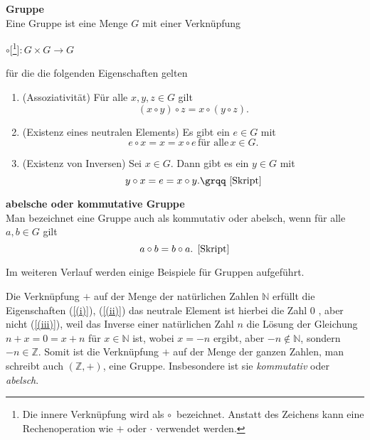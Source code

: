 \theoremstyle {definition}
\begin{definition} {\textbf{Gruppe}
\label{Gruppe}
	\\ {\glqq}Eine Gruppe ist eine Menge $G$ mit einer Verknüpfung 
\begin{center}
$\circ$[\footnote{Die innere Verknüpfung wird als \glqq $\circ$\grqq \, bezeichnet. Anstatt des Zeichens kann eine Rechenoperation wie $+$ oder $\cdot$ verwendet werden.}]$ : G \times G \rightarrow G$ 
\end{center}
für die die folgenden Eigenschaften gelten
\begin{enumerate}
	\item (Assoziativität) Für alle $x, y, z \in G$ gilt 	
	\label{(i)}
	\[(x \circ y) \circ z = x \circ (y \circ z)\text{.}\]
	\item (Existenz eines neutralen Elements) Es gibt ein $e \in G$ mit  
	\label{(ii)}	
	\[e \circ x = x = x \circ e \,\text{für alle}\, x \in G \text{.}\]
	\item (Existenz von Inversen) Sei $x \in G$. Dann gibt es ein $y \in G$ mit 
	\label{(iii)}	
	\[y \circ x = e = x \circ y \text{.{\grqq} \cite[S. 19, 4.2]{Skript}}\]
\end{enumerate}
}\end{definition}

\theoremstyle{definition}
\label{abl.Gruppe}
\begin{definition}{\textbf{abelsche oder kommutative Gruppe}}
	\\Man bezeichnet eine Gruppe auch als kommutativ oder abelsch, wenn für alle $a,b \in G$ gilt
\[a \circ b = b \circ a\text{. \cite[S. 19, 4.3]{Skript}}\]
\end{definition}

Im weiteren Verlauf werden einige Beispiele für Gruppen aufgeführt.
\theoremstyle{example}
\begin{example}{}
Die Verknüpfung $+$ auf der Menge der natürlichen Zahlen $\mathbb{N}$ erfüllt die Eigenschaften 
(\ref{(i)}), (\ref{(ii)}) {\textendash} das neutrale Element ist hierbei die Zahl $0$ {\textendash} , aber nicht (\ref{(iii)}), weil das Inverse einer natürlichen Zahl $n$ die Lösung der Gleichung $n + x = 0 = x + n $ für $x \in \mathbb{N}$ ist, wobei $ x = -n$ ergibt, aber $-n \not\in \mathbb{N}$, sondern $-n \in \mathbb{Z}$. Somit ist die Verknüpfung $+$ auf der Menge der ganzen Zahlen, man schreibt auch $(\mathbb{Z}, +)$, eine Gruppe. Insbesondere ist sie \emph{kommutativ} oder \emph{abelsch}.
\end{example}

